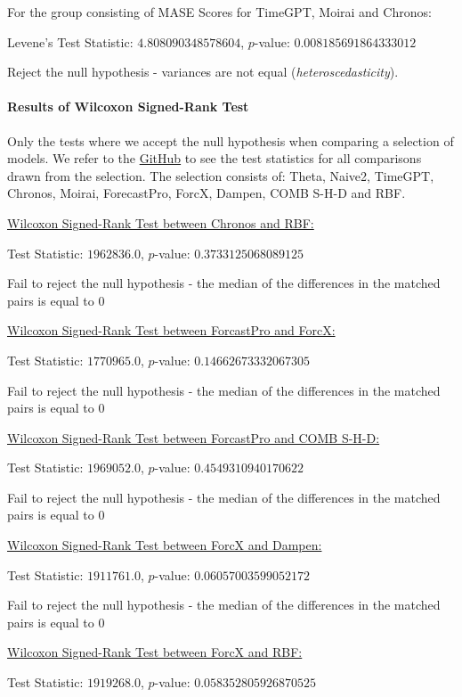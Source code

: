 \documentclass[12pt,a4paper]{article}
\begin{document}
For the group consisting of MASE Scores for TimeGPT, Moirai and Chronos:

Levene's Test Statistic: $4.808090348578604$, $p$-value: $0.008185691864333012$

Reject the null hypothesis - variances are not equal (\textit{heteroscedasticity}).

\paragraph{Results of Wilcoxon Signed-Rank Test}

Only the tests where we accept the null hypothesis when comparing a selection of models.
We refer to the \href{https://github.com/tom-alten/Outsmarting-Time/}{GitHub} to see the test statistics for all comparisons drawn from the selection.
The selection consists of: Theta, Naive2, TimeGPT, Chronos, Moirai, ForecastPro, ForcX, Dampen, COMB S-H-D and RBF.

\underline{Wilcoxon Signed-Rank Test between Chronos and RBF:}

Test Statistic: $1962836.0$, $p$-value: $0.3733125068089125$

Fail to reject the null hypothesis - the median of the differences in the matched pairs is equal to 0

\underline{Wilcoxon Signed-Rank Test between ForcastPro and ForcX:}

Test Statistic: $1770965.0$, $p$-value: $0.14662673332067305$

Fail to reject the null hypothesis - the median of the differences in the matched pairs is equal to 0

\underline{Wilcoxon Signed-Rank Test between ForcastPro and COMB S-H-D:}

Test Statistic: $1969052.0$, $p$-value: $0.4549310940170622$

Fail to reject the null hypothesis - the median of the differences in the matched pairs is equal to 0

\underline{Wilcoxon Signed-Rank Test between ForcX and Dampen:}

Test Statistic: $1911761.0$, $p$-value: $0.06057003599052172$

Fail to reject the null hypothesis - the median of the differences in the matched pairs is equal to 0

\underline{Wilcoxon Signed-Rank Test between ForcX and RBF:}

Test Statistic: $1919268.0$, $p$-value: $0.058352805926870525$
\end{document}
